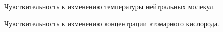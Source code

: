\documentclass[14pt, a4paper, fleqn]{extarticle}
\begin{document}
\begin{figure}
\caption{Чувствительность к изменению температуры нейтральных молекул.}
\end{figure}

\begin{figure}
\caption{Чувствительность к изменению концентрации атомарного кислорода.}
\end{figure}
\end{document}
